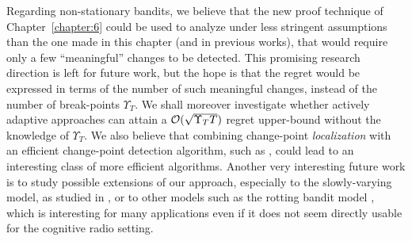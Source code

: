Regarding non-stationary bandits, we believe that the new proof technique of Chapter~\ref{chapter:6} could be used to analyze \GLRklUCB{} under less stringent assumptions than the one made in this chapter (and in previous works), that would require only a few ``meaningful'' changes to be detected.
This promising research direction is left for future work,  but the hope is that the regret would be expressed in terms of the number of such meaningful changes, instead of the number of break-points $\Upsilon_T$.
We shall moreover investigate whether actively adaptive approaches can attain a $\mathcal{O}(\sqrt{\Upsilon_T T})$ regret upper-bound without the knowledge of $\Upsilon_T$.
We also believe that combining change-point \emph{localization} with an efficient change-point detection algorithm, such as \GLRklUCB, could lead to an interesting class of more efficient algorithms.
Another very interesting future work is to study possible extensions of our approach, especially to the slowly-varying model, as studied in \cite{Besbes14stochastic,Louedec16,WeiSrivastava18Abruptly}, or to other models such as the rotting bandit model \cite{Seznec2018}, which is interesting for many applications even if it does not seem directly usable for the cognitive radio setting.

